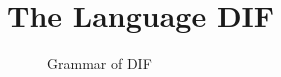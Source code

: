 \section{The Language DIF}

\begin{figure}[h]
    
    \caption{Grammar of DIF}
    \label{grammar}
\end{figure}
